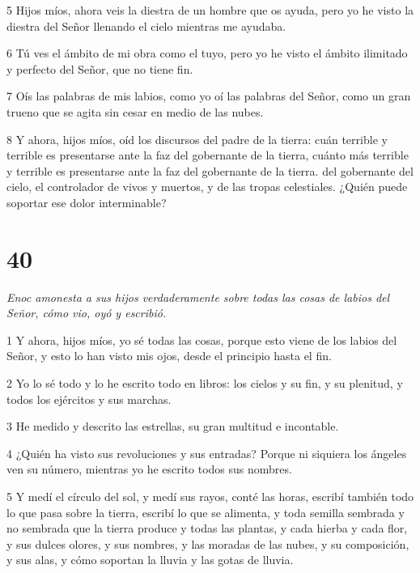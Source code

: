 \par 5 Hijos míos, ahora veis la diestra de un hombre que os ayuda, pero yo he visto la diestra del Señor llenando el cielo mientras me ayudaba.

\par 6 Tú ves el ámbito de mi obra como el tuyo, pero yo he visto el ámbito ilimitado y perfecto del Señor, que no tiene fin.

\par 7 Oís las palabras de mis labios, como yo oí las palabras del Señor, como un gran trueno que se agita sin cesar en medio de las nubes.

\par 8 Y ahora, hijos míos, oíd los discursos del padre de la tierra: cuán terrible y terrible es presentarse ante la faz del gobernante de la tierra, cuánto más terrible y terrible es presentarse ante la faz del gobernante de la tierra. del gobernante del cielo, el controlador de vivos y muertos, y de las tropas celestiales. ¿Quién puede soportar ese dolor interminable?

\chapter{40}

\par \textit{Enoc amonesta a sus hijos verdaderamente sobre todas las cosas de labios del Señor, cómo vio, oyó y escribió.}

\par 1 Y ahora, hijos míos, yo sé todas las cosas, porque esto viene de los labios del Señor, y esto lo han visto mis ojos, desde el principio hasta el fin.

\par 2 Yo lo sé todo y lo he escrito todo en libros: los cielos y su fin, y su plenitud, y todos los ejércitos y sus marchas.

\par 3 He medido y descrito las estrellas, su gran multitud e incontable.

\par 4 ¿Quién ha visto sus revoluciones y sus entradas? Porque ni siquiera los ángeles ven su número, mientras yo he escrito todos sus nombres.

\par 5 Y medí el círculo del sol, y medí sus rayos, conté las horas, escribí también todo lo que pasa sobre la tierra, escribí lo que se alimenta, y toda semilla sembrada y no sembrada que la tierra produce y todas las plantas, y cada hierba y cada flor, y sus dulces olores, y sus nombres, y las moradas de las nubes, y su composición, y sus alas, y cómo soportan la lluvia y las gotas de lluvia.

